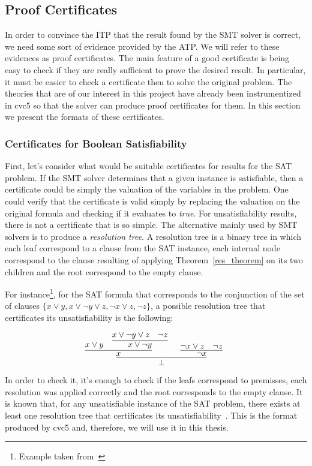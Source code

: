 \subsection{Proof Certificates}\label{sec:proof_cert}

In order to convince the ITP that the result found by the SMT solver is correct, we need some sort of evidence provided by the ATP.
We will refer to these evidences as proof certificates. The main feature of a good certificate is being easy to check if they are really sufficient to prove the desired result. In particular, it must be easier to check a certificate then to solve the original problem. The theories that are of our interest in this project have already been instrumentized in cvc5 so that the solver can produce proof certificates for them. In this section we present the formats of these certificates.

\subsubsection{Certificates for Boolean Satisfiability}

First, let's consider what would be suitable certificates for results for the SAT problem. If the SMT solver determines that a given instance is satisfiable, then a certificate could be simply the valuation of the variables in the problem. One could verify that the certificate is valid simply by replacing the valuation on the original formula and checking if it evaluates to \textit{true}. For unsatisfiability results, there is not a certificate that is so simple. The alternative mainly used by SMT solvers is to produce a \textit{resolution tree}. A resolution tree is a binary tree in which each leaf correspond to a clause from the SAT instance, each internal node correspond to the clause resulting of applying Theorem~\ref{res_theorem} on its two children and the root correspond to the empty clause.

For instance\footnote{Example taken from~\cite{smtcoq}}, for the SAT formula that corresponds to the conjunction of the set of clauses $\{x \vee y, x \vee \neg y \vee z, \neg x \vee z,  \neg z\}$, a possible resolution tree that certificates its unsatisfiability is the following:

\inferLineSkip=3pt
\[
\infer[]{\bot}{
  \infer[]
  {x}
  {x \vee y & \infer[]{x \vee \neg y}{x \vee \neg y \vee z & \neg z}} & \infer[]{\neg x}{\neg x \vee z & \neg z}}
\]

In order to check it, it's enough to check if the leafs correspond to premisses, each resolution was applied correctly and the root corresponds to the empty clause. It is known that, for any unsatisfiable instance of the SAT problem, there exists at least one resolution tree that certificates its unsatisfiability~\cite{res_tree_complete}. This is the format produced by cvc5 and, therefore, we will use it in this thesis.

